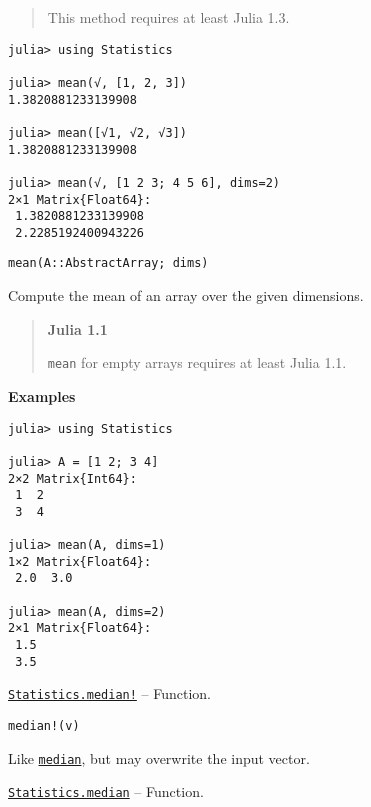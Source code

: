 \begin{adjustwidth}{2em}{0pt}
\begin{quote}
This method requires at least Julia 1.3.

\end{quote}

\begin{verbatim}
julia> using Statistics

julia> mean(√, [1, 2, 3])
1.3820881233139908

julia> mean([√1, √2, √3])
1.3820881233139908

julia> mean(√, [1 2 3; 4 5 6], dims=2)
2×1 Matrix{Float64}:
 1.3820881233139908
 2.2285192400943226
\end{verbatim}




\begin{lstlisting}
mean(A::AbstractArray; dims)
\end{lstlisting}

Compute the mean of an array over the given dimensions.

\begin{quote}
\textbf{Julia 1.1}

\texttt{mean} for empty arrays requires at least Julia 1.1.

\end{quote}
\textbf{Examples}


\begin{verbatim}
julia> using Statistics

julia> A = [1 2; 3 4]
2×2 Matrix{Int64}:
 1  2
 3  4

julia> mean(A, dims=1)
1×2 Matrix{Float64}:
 2.0  3.0

julia> mean(A, dims=2)
2×1 Matrix{Float64}:
 1.5
 3.5
\end{verbatim}



\end{adjustwidth}
\hypertarget{5238557773914917939}{}
\hyperlink{5238557773914917939}{\texttt{Statistics.median!}}  -- {Function.}

\begin{adjustwidth}{2em}{0pt}


\begin{verbatim}
median!(v)
\end{verbatim}

Like \hyperlink{7663137055249909841}{\texttt{median}}, but may overwrite the input vector.



\end{adjustwidth}
\hypertarget{7663137055249909841}{}
\hyperlink{7663137055249909841}{\texttt{Statistics.median}}  -- {Function.}

